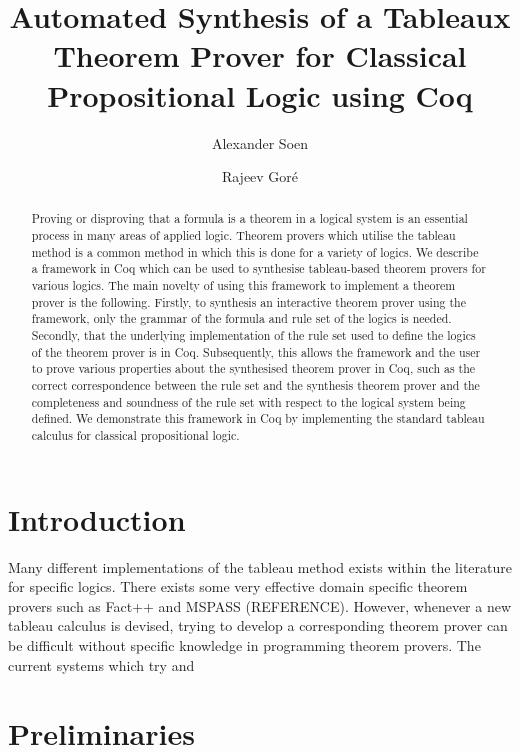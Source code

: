\documentclass{llncs}
\begin{document}
\title{Automated Synthesis of a Tableaux Theorem Prover for Classical
Propositional Logic using Coq}

\author{Alexander Soen \and Rajeev Goré}

\maketitle

\begin{abstract}
Proving or disproving that a formula is a theorem in a logical system is an
essential process in many areas of applied logic. Theorem provers which utilise
the tableau method is a common method in which this is done for a variety of
logics. We describe a framework in Coq which can be used to synthesise
tableau-based theorem provers for various logics. The main novelty of using
this framework to implement a theorem prover is the following. Firstly, to
synthesis an interactive theorem prover using the framework, only the grammar
of the formula and rule set of the logics is needed. Secondly, that the
underlying implementation of the rule set used to define the logics of the
theorem prover is in Coq. Subsequently, this allows the framework and the user
to prove various properties about the synthesised theorem prover in Coq, such
as the correct correspondence between the rule set and the synthesis theorem
prover and the completeness and soundness of the rule set with respect to the
logical system being defined. We demonstrate this framework in Coq by
implementing the standard tableau calculus for classical propositional logic.
\end{abstract}

\section{Introduction}

Many different implementations of the tableau method exists within the
literature for specific logics. There exists some very effective domain
specific theorem provers such as Fact++ and MSPASS (REFERENCE). However,
whenever a new tableau calculus is devised, trying to develop a corresponding
theorem prover can be difficult without specific knowledge in programming
theorem provers. The current systems which try and 

\section{Preliminaries}
\end{document}
